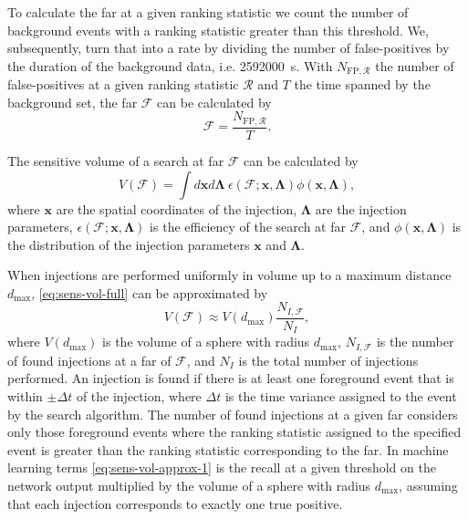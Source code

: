 To calculate the \acrshort{far} at a given ranking statistic we count the number of background events with a ranking statistic greater than this threshold. We, subsequently, turn that into a rate by dividing the number of false-positives by the duration of the background data, i.e. \SI{2592000}{\second}. With $N_{\text{FP}, \mathcal{R}}$ the number of false-positives at a given ranking statistic $\mathcal{R}$ and $T$ the time spanned by the background set, the \acrshort{far} $\mathcal{F}$ can be calculated by
\begin{equation}
    \mathcal{F} = \frac{N_{\text{FP}, \mathcal{R}}}{T}.
\end{equation}

The sensitive volume of a search at \acrshort{far} $\mathcal{F}$ can be calculated by~\cite{Usman:2015kfa}
\begin{equation}\label{eq:sens-vol-full}
    V\left(\mathcal{F}\right) = \int d\bm{x}d\bm{\Lambda}\ \epsilon\left(\mathcal{F};\bm{x},\bm{\Lambda}\right)\phi\left(\bm{x},\bm{\Lambda}\right),
\end{equation}
where $\bm{x}$ are the spatial coordinates of the injection, $\bm{\Lambda}$ are the injection parameters, $\epsilon\left(\mathcal{F};\bm{x},\bm{\Lambda}\right)$ is the efficiency of the search at \acrshort{far} $\mathcal{F}$, and $\phi\left(\bm{x},\bm{\Lambda}\right)$ is the distribution of the injection parameters $\bm{x}$ and $\bm{\Lambda}$.

When injections are performed uniformly in volume up to a maximum distance $d_\text{max}$, \autoref{eq:sens-vol-full} can be approximated by~\cite{Usman:2015kfa}
\begin{equation}\label{eq:sens-vol-approx-1}
    V\left(\mathcal{F}\right)\approx V\left(d_\text{max}\right)\frac{N_{I,\mathcal{F}}}{N_I},
\end{equation}
where $ V\left(d_\text{max}\right)$ is the volume of a sphere with radius $d_\text{max}$, $N_{I,\mathcal{F}}$ is the number of found injections at a \acrshort{far} of $\mathcal{F}$, and $N_I$ is the total number of injections performed. An injection is found if there is at least one foreground event that is within $\pm \Delta t$ of the injection, where $\Delta t$ is the time variance assigned to the event by the search algorithm. The number of found injections at a given \acrshort{far} considers only those foreground events where the ranking statistic assigned to the specified event is greater than the ranking statistic corresponding to the \acrshort{far}. In machine learning terms \autoref{eq:sens-vol-approx-1} is the recall at a given threshold on the network output multiplied by the volume of a sphere with radius $d_\text{max}$, assuming that each injection corresponds to exactly one true positive.

